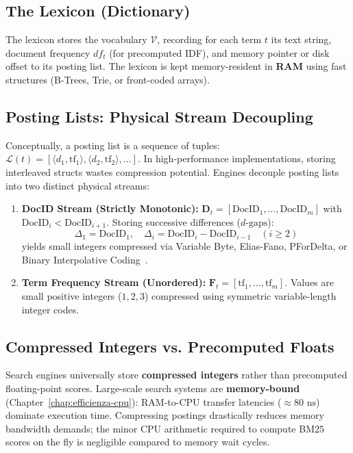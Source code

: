 \subsection{The Lexicon (Dictionary)}
The lexicon stores the vocabulary $\mathcal{V}$, recording for each term $t$ its text string, document frequency $df_t$ (for precomputed IDF), and memory pointer or disk offset to its posting list. The lexicon is kept memory-resident in \textbf{RAM} using fast structures (B-Trees, Trie, or front-coded arrays).

\subsection{Posting Lists: Physical Stream Decoupling}
Conceptually, a posting list is a sequence of tuples: $\mathcal{L}(t) = [\langle d_1, \text{tf}_1 \rangle, \langle d_2, \text{tf}_2 \rangle, \dots]$. In high-performance implementations, storing interleaved structs wastes compression potential. Engines decouple posting lists into two distinct physical streams:
\begin{enumerate}
    \item \textbf{DocID Stream (Strictly Monotonic):}
    $\mathbf{D}_t = [\text{DocID}_1, \dots, \text{DocID}_m]$ with $\text{DocID}_i < \text{DocID}_{i+1}$. Storing successive differences ($d\text{-gaps}$):
    \begin{equation}
    \Delta_1 = \text{DocID}_1, \quad \Delta_i = \text{DocID}_i - \text{DocID}_{i-1} \quad (i \ge 2)
    \end{equation}
    yields small integers compressed via Variable Byte, Elias-Fano, PForDelta, or Binary Interpolative Coding~\cite{moffat2000}.
    \item \textbf{Term Frequency Stream (Unordered):}
    $\mathbf{F}_t = [\text{tf}_1, \dots, \text{tf}_m]$. Values are small positive integers ($1, 2, 3$) compressed using symmetric variable-length integer codes.
\end{enumerate}

\subsection{Compressed Integers vs. Precomputed Floats}
Search engines universally store \textbf{compressed integers} rather than precomputed floating-point scores. Large-scale search systems are \textbf{memory-bound} (Chapter~\ref{chap:efficienza-cpu}): RAM-to-CPU transfer latencies ($\approx 80\text{ ns}$) dominate execution time. Compressing postings drastically reduces memory bandwidth demands; the minor CPU arithmetic required to compute BM25 scores on the fly is negligible compared to memory wait cycles.

